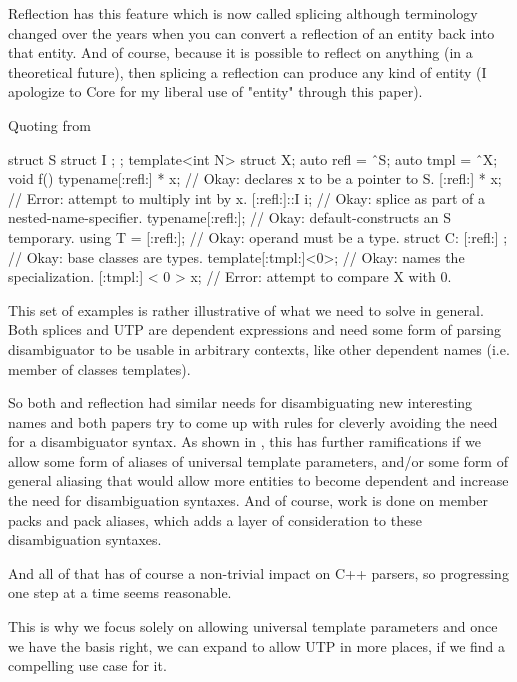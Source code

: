 \documentclass{wg21}
\begin{document}
Reflection has this feature which is now called splicing although terminology changed over the years when you can convert a reflection of an entity
back into that entity. And of course, because it is possible to reflect on anything (in a theoretical future), then splicing a reflection
can produce any kind of entity (I apologize to Core for my liberal use of "entity" through this paper).

Quoting from 

\begin{quoteblock}
\begin{colorblock}
struct S { struct I { }; };
template<int N> struct X;
auto refl = ˆS;
auto tmpl = ˆX;
void f() {
    typename[:refl:] * x; // Okay: declares x to be a pointer to S.
    [:refl:] * x; // Error: attempt to multiply int by x.
    [:refl:]::I i; // Okay: splice as part of a nested-name-specifier.
    typename[:refl:]{}; // Okay: default-constructs an S temporary.
    using T = [:refl:]; // Okay: operand must be a type.
    struct C: [:refl:] {}; // Okay: base classes are types.
    template[:tmpl:]<0>; // Okay: names the specialization.
    [:tmpl:] < 0 > x; // Error: attempt to compare X with 0.
}
\end{colorblock}
\end{quoteblock}

This set of examples is rather illustrative of what we need to solve in general.
Both splices and UTP are dependent expressions and need some form of parsing disambiguator to be usable
in arbitrary contexts, like other dependent names (i.e. member of classes templates).

So both  and reflection had similar needs for disambiguating new interesting names and
both papers try to come up with rules for cleverly avoiding the need for a disambiguator syntax.
As shown in , this has further ramifications if we allow some form of aliases of universal template parameters, and/or some form of general aliasing that would allow more entities to become dependent
and increase the need for disambiguation syntaxes.
And of course, work is done on member packs and pack aliases, which adds a layer of consideration to these disambiguation syntaxes.

And all of that has of course a non-trivial impact on C++ parsers, so progressing one step at a time seems reasonable.

This is why we focus solely on allowing universal template parameters and once we have the basis right, we can expand to
allow UTP in more places, if we find a compelling use case for it.
\end{document}
